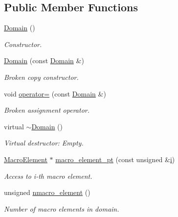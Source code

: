 \subsection*{Public Member Functions}
\begin{DoxyCompactItemize}
\item 
\hyperlink{classoomph_1_1Domain_a091982333107142c3ac71a02fbdb6ac8}{Domain} ()
\begin{DoxyCompactList}\small\item\em Constructor. \end{DoxyCompactList}\item 
\hyperlink{classoomph_1_1Domain_a3ca7b8845faa8689ec8d2c396383bc29}{Domain} (const \hyperlink{classoomph_1_1Domain}{Domain} \&)
\begin{DoxyCompactList}\small\item\em Broken copy constructor. \end{DoxyCompactList}\item 
void \hyperlink{classoomph_1_1Domain_a43b1baf8fcafd4a75d54cf915e4dca44}{operator=} (const \hyperlink{classoomph_1_1Domain}{Domain} \&)
\begin{DoxyCompactList}\small\item\em Broken assignment operator. \end{DoxyCompactList}\item 
virtual \hyperlink{classoomph_1_1Domain_afd6c101003640d74becabcd8f1dcbc67}{$\sim$\+Domain} ()
\begin{DoxyCompactList}\small\item\em Virtual destructor\+: Empty. \end{DoxyCompactList}\item 
\hyperlink{classoomph_1_1MacroElement}{Macro\+Element} $\ast$ \hyperlink{classoomph_1_1Domain_a9d8ca47c89812a0d6dda0b9142441efc}{macro\+\_\+element\+\_\+pt} (const unsigned \&\hyperlink{cfortran_8h_adb50e893b86b3e55e751a42eab3cba82}{i})
\begin{DoxyCompactList}\small\item\em Access to i-\/th macro element. \end{DoxyCompactList}\item 
unsigned \hyperlink{classoomph_1_1Domain_a3ed63583615d0e8471d95ba13ccc0aff}{nmacro\+\_\+element} ()
\begin{DoxyCompactList}\small\item\em Number of macro elements in domain. \end{DoxyCompactList}\item 

\end{DoxyCompactItemize}
